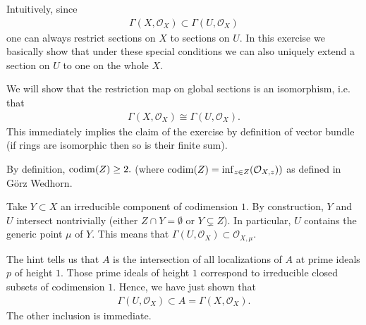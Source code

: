\begin{exercise}{4}
    Intuitively, since
    \begin{align*}
        \Gamma(X,\mathcal{O}_X)\subset \Gamma(U,\mathcal{O}_X)
     \end{align*}
     one can always restrict sections on $X$ to sections on $U$. In this exercise we basically show that under these
     special conditions we can also uniquely extend a section on $U$ to one on the whole $X$.


    We will show that the restriction map on global sections is an isomorphism, i.e. that
    \begin{align*}
        \Gamma(X,\mathcal{O}_X)\cong \Gamma(U,\mathcal{O}_X).
    \end{align*}
    This immediately implies the claim of the exercise by definition of vector bundle (if rings are isomorphic
    then so is their finite sum).

    By definition, $\operatorname{codim}(Z)\geq 2.$ (where $\operatorname{codim}(Z)=\inf_{z\in Z}(\mathcal{O}_{X,z}))$ as defined in Görz Wedhorn.

    Take $Y\subset X$ an irreducible component of codimension $1$. By construction, $Y$ and $U$ intersect nontrivially
     (either $Z\cap Y=\emptyset$ or $Y\subsetneq Z$). 
     In particular, $U$ contains the generic point $\mu$ of $Y$. 
     This means that $\Gamma(U,\mathcal{O}_X)\subset \mathcal{O}_{X,\mu}$.

     The hint tells us that $A$ is the intersection of all localizations of $A$ at prime ideals $p$ of height $1$.
     Those prime ideals of height $1$ correspond to irreducible closed subsets of codimension $1$. Hence, we have just shown that
     \begin{align*}
        \Gamma(U,\mathcal{O}_X)\subset A = \Gamma(X,\mathcal{O}_X).
     \end{align*}
     The other inclusion is immediate.
\end{exercise}


